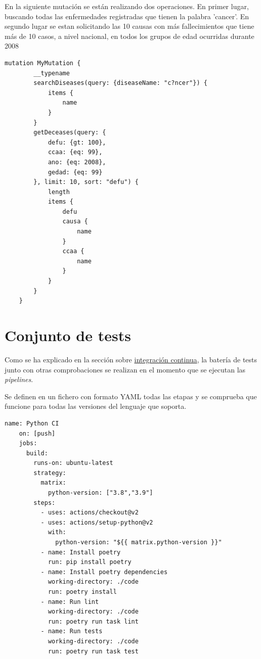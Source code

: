 En la siguiente mutación se están realizando dos operaciones. En primer lugar, buscando
todas las enfermedades registradas que tienen la palabra 'cancer'. En segundo lugar se
estan solicitando las 10 causas con más fallecimientos que tiene más de 10 casos, a nivel
nacional, en todos los grupos de edad ocurridas durante 2008
\begin{lstlisting}[caption=Ejemplo de mutación usando el protocolo GraphQL] 
    mutation MyMutation {
        __typename
        searchDiseases(query: {diseaseName: "c?ncer"}) {
            items {
                name
            }
        }
        getDeceases(query: {
            defu: {gt: 100}, 
            ccaa: {eq: 99}, 
            ano: {eq: 2008}, 
            gedad: {eq: 99}
        }, limit: 10, sort: "defu") {
            length
            items {
                defu
                causa {
                    name
                }
                ccaa {
                    name
                }
            }
        }
    }
\end{lstlisting}

\section{Conjunto de tests}
Como se ha explicado en la sección sobre \hyperref[sec:ci]{integración continua}, la
batería de tests junto con otras comprobaciones se realizan en el momento que se ejecutan las \textit{pipelines}.

Se definen en un fichero con formato YAML todas las etapas y se comprueba que funcione para todas
las versiones del lenguaje que soporta.
\begin{lstlisting}[caption=Definición de las etapas que tiene la CI del código del proyecto. ]
    name: Python CI
    on: [push]
    jobs:
      build:
        runs-on: ubuntu-latest
        strategy:
          matrix:
            python-version: ["3.8","3.9"]
        steps:
          - uses: actions/checkout@v2
          - uses: actions/setup-python@v2
            with:
              python-version: "${{ matrix.python-version }}"
          - name: Install poetry
            run: pip install poetry
          - name: Install poetry dependencies
            working-directory: ./code
            run: poetry install
          - name: Run lint
            working-directory: ./code
            run: poetry run task lint
          - name: Run tests
            working-directory: ./code
            run: poetry run task test
\end{lstlisting}

